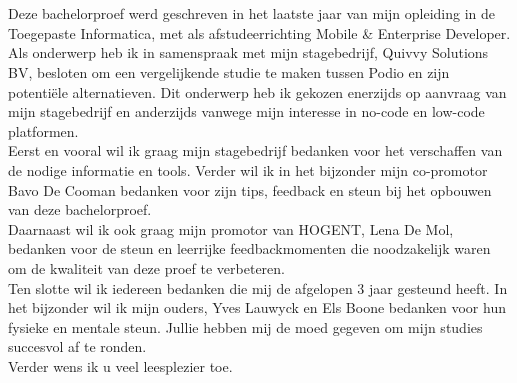 
\chapter*{}%
\label{ch:voorwoord}


Deze bachelorproef werd geschreven in het laatste jaar van mijn opleiding in de Toegepaste Informatica, met als afstudeerrichting Mobile \& Enterprise Developer. \\

Als onderwerp heb ik in samenspraak met mijn stagebedrijf, Quivvy Solutions BV, besloten om een vergelijkende studie te maken tussen Podio en zijn potentiële alternatieven. Dit onderwerp heb ik gekozen enerzijds op aanvraag van mijn stagebedrijf en anderzijds vanwege mijn interesse in no-code en low-code platformen. \\

Eerst en vooral wil ik graag mijn stagebedrijf bedanken voor het verschaffen van de nodige informatie en tools. Verder wil ik in het bijzonder mijn co-promotor Bavo De Cooman bedanken voor zijn tips, feedback en steun bij het opbouwen van deze bachelorproef. \\

Daarnaast wil ik ook graag mijn promotor van HOGENT, Lena De Mol, bedanken voor de steun en leerrijke feedbackmomenten die noodzakelijk waren om de kwaliteit van deze proef te verbeteren. \\

Ten slotte wil ik iedereen bedanken die mij de afgelopen 3 jaar gesteund heeft. In het bijzonder wil ik mijn ouders, Yves Lauwyck en Els Boone bedanken voor hun fysieke en mentale steun. Jullie hebben mij de moed gegeven om mijn studies succesvol af te ronden. \\

Verder wens ik u veel leesplezier toe. \\